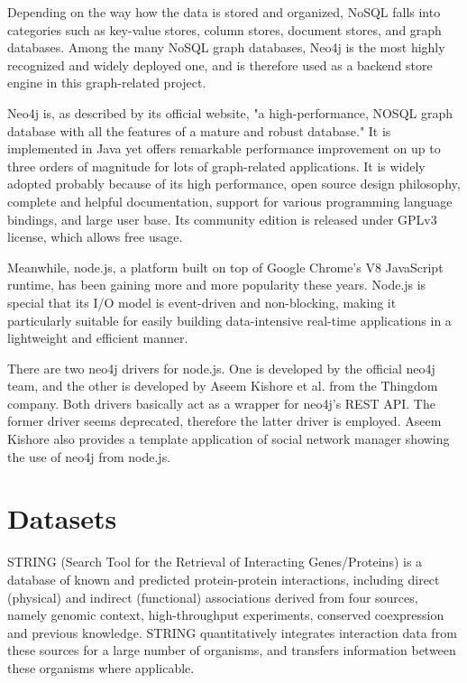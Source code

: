 \documentclass[10pt,conference,compsocconf]{../IEEEtran}
\begin{document}
Depending on the way how the data is stored and organized, NoSQL falls into categories such as key-value stores, column stores, document stores, and graph databases. Among the many NoSQL graph databases, Neo4j \citep{1076} is the most highly recognized and widely deployed one, and is therefore used as a backend store engine in this graph-related project.

Neo4j is, as described by its official website, "a high-performance, NOSQL graph database with all the features of a mature and robust database." It is implemented in Java yet offers remarkable performance improvement on up to three orders of magnitude for lots of graph-related applications. It is widely adopted probably because of its high performance, open source design philosophy, complete and helpful documentation, support for various programming language bindings, and large user base. Its community edition is released under GPLv3 license, which allows free usage.

Meanwhile, node.js, a platform built on top of Google Chrome's V8 JavaScript runtime, has been gaining more and more popularity these years. Node.js is special that its I/O model is event-driven and non-blocking, making it particularly suitable for easily building data-intensive real-time applications in a lightweight and efficient manner. 

There are two neo4j drivers for node.js. One is developed by the official neo4j team, and the other is developed by Aseem Kishore et al. from the Thingdom company. Both drivers basically act as a wrapper for neo4j's REST API. The former driver seems deprecated, therefore the latter driver is employed. Aseem Kishore also provides a template application of social network manager showing the use of neo4j from node.js.

\section{Datasets}

STRING (Search Tool for the Retrieval of Interacting Genes/Proteins) \citep{1070,1071,1072,1073,1074,1075} is a database of known and predicted protein-protein interactions, including direct (physical) and indirect (functional) associations derived from four sources, namely genomic context, high-throughput experiments, conserved coexpression and previous knowledge. STRING quantitatively integrates interaction data from these sources for a large number of organisms, and transfers information between these organisms where applicable.
\end{document}
